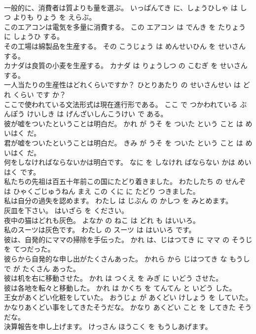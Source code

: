 \documentclass[8pt]{extreport}
\begin{document}
\begin{CJK}{UTF8}{min}
\\	一般的に、消費者は質よりも量を選ぶ。	いっぱんてき に、しょうひしゃ は しつ よりも りょう を えらぶ。	
\\	このエアコンは電気を多量に消費する。	この エアコン は でんき を たりょう に しょうひ する。	
\\	その工場は綿製品を生産する。	その こうじょう は めんせいひん を せいさん する。	
\\	カナダは良質の小麦を生産する。	カナダ は りょうしつ の こむぎ を せいさん する。	
\\	一人当たりの生産性はどれくらいですか？	ひとりあたり の せいさんせい は どれ くらい です か？	
\\	ここで使われている文法形式は現在進行形である。	ここ で つかわれている ぶんぽう けいしき は げんざいしんこうけい で ある。	
\\	彼が嘘をついたということは明白だ。	かれ が うそ を ついた という こと は めいはく だ。	
\\	君が嘘をついたということは明白だ。	きみ が うそ を ついた という こと は めいはく だ。	
\\	何をしなければならないかは明白です。	なに を しなけれ ばならない かは めいはく です。	
\\	私たちの先祖は百五十年前この国にたどり着きました。	わたしたち の せんぞ は ひゃくごじゅうねん まえ この くに に たどり つきました。	
\\	私は自分の過失を認めます。	わたし は じぶん の かしつ を みとめます。	
\\	灰皿を下さい。	はいざら を ください。	
\\	夜中の猫はどれも灰色。	よなか の ねこ は どれ も はいいろ。	
\\	私のスーツは灰色です。	わたし の スーツ は はいいろ です。	
\\	彼は、自発的にママの掃除を手伝った。	かれ は、じはつてき に ママ の そうじ を てつだった。	
\\	彼らから自発的な申し出がたくさんあった。	かれら から じはつてき な もうしで が たくさん あった。	
\\	彼は机を右に移動させた。	かれ は つくえ を みぎ に いどう させた。	
\\	彼は各地を転々と移動した。	かれ は かくち を てんてん と いどう した。	
\\	王女があくどい化粧をしていた。	おうじょ が あくどい けしょう を していた。	
\\	かなりあくどい事をしてきたそうだな。	かなり あくどい こと を してきた そう だな。	
\\	決算報告を申し上げます。	けっさん ほうこく を もうしあげます。	

\end{CJK}
\end{document}
